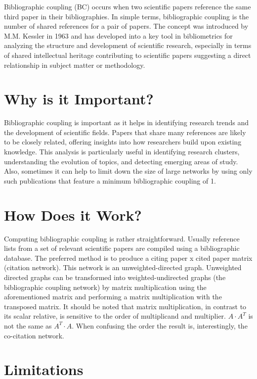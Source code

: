 \documentclass[
  letterpaper,
]{scrreprt}
\begin{document}
Bibliographic coupling (BC) occurs when two scientific papers reference
the same third paper in their bibliographies. In simple terms,
bibliographic coupling is the number of shared references for a pair of
papers. The concept was introduced by M.M. Kessler in 1963 and has
developed into a key tool in bibliometrics for analyzing the structure
and development of scientific research, especially in terms of shared
intellectual heritage contributing to scientific papers suggesting a
direct relationship in subject matter or methodology.

\section{Why is it Important?}\label{why-is-it-important-12}

Bibliographic coupling is important as it helps in identifying research
trends and the development of scientific fields. Papers that share many
references are likely to be closely related, offering insights into how
researchers build upon existing knowledge. This analysis is particularly
useful in identifying research clusters, understanding the evolution of
topics, and detecting emerging areas of study. Also, sometimes it can
help to limit down the size of large networks by using only such
publications that feature a minimum bibliographic coupling of 1.

\section{How Does it Work?}\label{how-does-it-work-10}

Computing bibliographic coupling is rather straightforward. Usually
reference lists from a set of relevant scientific papers are compiled
using a bibliographic database. The preferred method is to produce a
citing paper x cited paper matrix (citation network). This network is an
unweighted-directed graph. Unweighted directed graphs can be transformed
into weighted-undirected graphs (the bibliographic coupling network) by
matrix multiplication using the aforementioned matrix and performing a
matrix multiplication with the transposed matrix. It should be noted
that matrix multiplication, in contrast to its scalar relative, is
sensitive to the order of multiplicand and multiplier. \(A \cdot A^T\)
is not the same as \(A^T \cdot A\). When confusing the order the result
is, interestingly, the co-citation network.

\section{Limitations}\label{limitations-13}
\end{document}

